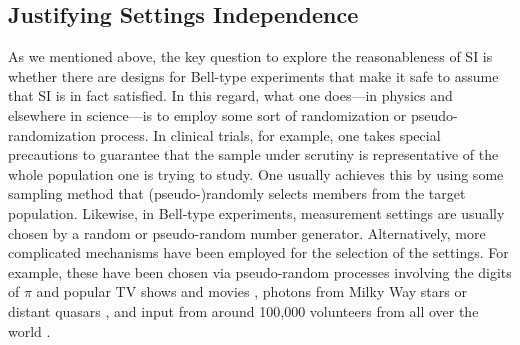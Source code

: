 \documentclass[letterpaper,12pt]{article}
\begin{document}
\subsection{Justifying Settings Independence}

As we mentioned above, the key question to explore the reasonableness of SI is whether there are designs for Bell-type experiments that make it safe to assume that SI is in fact satisfied. In this regard, what one does---in physics and elsewhere in science---is to employ some sort of randomization or pseudo-randomization %
process. In clinical trials, for example, one takes special precautions to guarantee that the sample under scrutiny is representative of the whole population one is trying to study. One usually achieves this by using some sampling method that (pseudo-)randomly selects members from the target population. Likewise, in Bell-type experiments, measurement settings are usually chosen by a random or pseudo-random number generator. %
Alternatively, more complicated mechanisms have been employed for the selection of the settings. For example, these have been chosen via pseudo-random processes involving the digits of $\pi$ and popular TV shows and movies \cite{Shalm}, photons from Milky Way stars \cite{Handsteiner} or distant quasars \cite{Rauch}, and input from around 100,000 volunteers from all over the world \cite{Abellan}.
\end{document}
